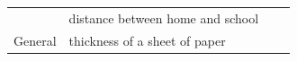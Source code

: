 {\begin{center}
\begin{xtabular*}{\mytablewidth}[t]{|p{10\mystarwidth}|p{10\mystarwidth}|p{10\mystarwidth}|p{10\mystarwidth}|}
    
         &
    
    
        distance between home and school &
    
    
         &
    
    
     \tabularnewline{}
    
    
        General &
    
    
        thickness of a sheet of paper &
    
    
         &
    
    
     \tabularnewline{}
    

\end{xtabular*}
\end{center}}
